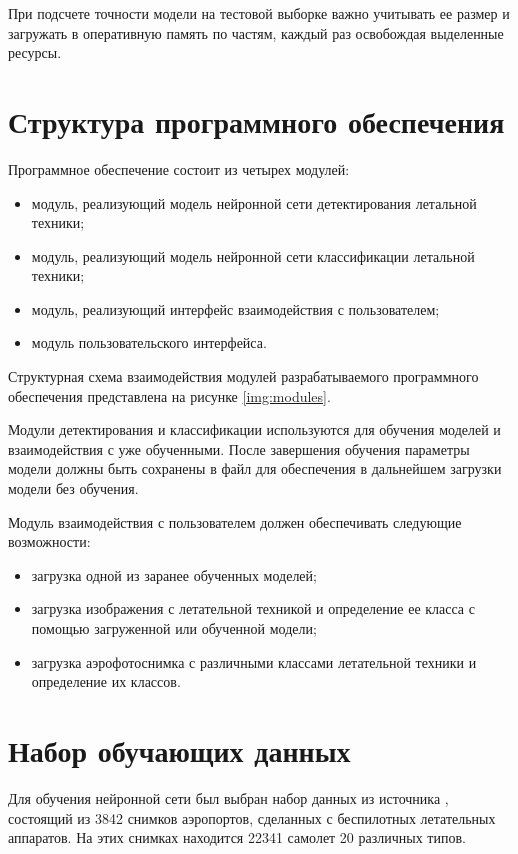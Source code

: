 При подсчете точности модели на тестовой выборке важно учитывать ее размер и загружать в оперативную память по частям, каждый раз освобождая выделенные ресурсы.

\section{Структура программного обеспечения}

Программное обеспечение состоит из четырех модулей:
\begin{itemize}
	\item модуль, реализующий модель нейронной сети детектирования летальной техники;
	\item модуль, реализующий модель нейронной сети классификации летальной техники;
	\item модуль, реализующий интерфейс взаимодействия с пользователем;
	\item модуль пользовательского интерфейса.
\end{itemize}

Структурная схема взаимодействия модулей разрабатываемого программного обеспечения представлена на рисунке \ref{img:modules}.

Модули детектирования и классификации используются для обучения моделей и взаимодействия с уже обученными. После завершения обучения параметры модели должны быть сохранены в файл для обеспечения в дальнейшем загрузки модели без обучения.

Модуль взаимодействия с пользователем должен обеспечивать следующие возможности:
\begin{itemize}
	\item загрузка одной из заранее обученных моделей;
	\item загрузка изображения с летательной техникой и определение ее класса с помощью загруженной или обученной модели;
	\item загрузка аэрофотоснимка с различными классами летательной техники и определение их классов.
\end{itemize} 

\section{Набор обучающих данных}

Для обучения нейронной сети был выбран набор данных из источника \cite{planesdataset}, состоящий из 3842 снимков аэропортов, сделанных с беспилотных летательных аппаратов. На этих снимках находится 22341 самолет 20 различных типов.

